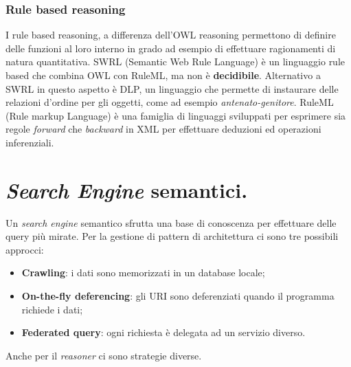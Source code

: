 \documentclass[11pt]{article}
\begin{document}
\subsubsection{Rule based reasoning}
I rule based reasoning, a differenza dell'OWL reasoning permettono di definire delle funzioni al loro interno in grado ad esempio di effettuare ragionamenti di natura quantitativa. SWRL (Semantic Web Rule Language) è un linguaggio rule based che combina OWL con RuleML, ma non è \textbf{decidibile}. Alternativo a SWRL in questo aspetto è DLP, un linguaggio che permette di instaurare delle relazioni d'ordine per gli oggetti, come ad esempio \textit{antenato-genitore}. RuleML (Rule markup Language) è una famiglia di linguaggi sviluppati per esprimere sia regole \textit{forward} che \textit{backward} in XML per effettuare deduzioni ed operazioni inferenziali.
\section{\textit{Search Engine} semantici.}
Un \textit{search engine} semantico sfrutta una base di conoscenza per effettuare delle query più mirate.
Per la gestione di pattern di architettura ci sono tre possibili approcci:
\begin{itemize}
\item \textbf{Crawling}: i dati sono memorizzati in un database locale;
\item \textbf{On-the-fly deferencing}: gli URI sono deferenziati quando il programma richiede i dati;
\item \textbf{Federated query}: ogni richiesta è delegata ad un servizio diverso.
\end{itemize}
Anche per il \textit{reasoner} ci sono strategie diverse.
\end{document}
